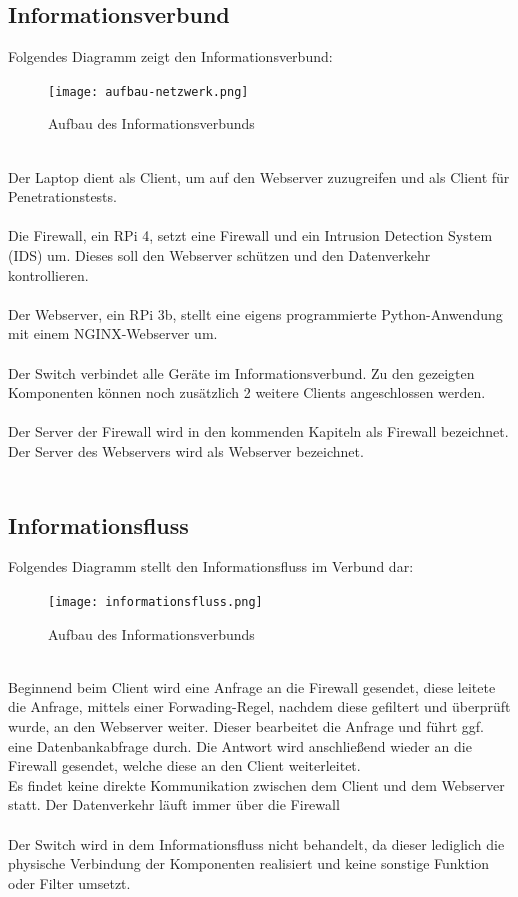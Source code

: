 \documentclass[
    a4paper,
    pagesize,
	pdftex,
    12pt,
]{scrartcl}
\begin{document}
\subsection{Informationsverbund}
Folgendes Diagramm zeigt den Informationsverbund:
\begin{figure}[!ht]
	\centering
	\texttt{[image: aufbau-netzwerk.png]}
	\caption{Aufbau des Informationsverbunds}
	\label{fig:boat1}
\end{figure}
\\
Der Laptop dient als Client, um auf den Webserver zuzugreifen und als Client für  Penetrationstests.  \\ \\
Die Firewall, ein RPi 4, setzt eine Firewall und ein  Intrusion Detection System (IDS) um. Dieses soll den Webserver schützen und den Datenverkehr  kontrollieren.  \\ \\
Der Webserver, ein RPi 3b, stellt eine eigens programmierte Python-Anwendung mit einem NGINX-Webserver um. \\ \\
Der Switch verbindet alle Geräte im Informationsverbund.  Zu den  gezeigten Komponenten können noch zusätzlich  2 weitere  Clients  angeschlossen werden. \\ \\
Der Server der Firewall wird in den kommenden Kapiteln als Firewall bezeichnet. Der Server des Webservers wird als Webserver bezeichnet. \\ \\

\subsection{Informationsfluss}
Folgendes Diagramm stellt den Informationsfluss im Verbund dar:
\begin{figure}[!ht]
	\centering
	\texttt{[image: informationsfluss.png]}
	\caption{Aufbau des Informationsverbunds}
	\label{fig:boat2}
\end{figure}
\\
Beginnend beim Client wird eine Anfrage an die Firewall gesendet, diese leitete die Anfrage, mittels einer Forwading-Regel, nachdem diese gefiltert und überprüft wurde, an den Webserver weiter. Dieser bearbeitet die Anfrage und führt ggf. eine Datenbankabfrage durch. Die Antwort wird anschließend wieder an die Firewall gesendet, welche diese an den Client weiterleitet. \\
Es findet keine direkte Kommunikation zwischen dem Client und dem Webserver statt. Der Datenverkehr läuft immer über die Firewall
\\ \\
Der Switch wird in dem Informationsfluss nicht behandelt, da dieser lediglich die physische Verbindung der Komponenten realisiert und keine sonstige Funktion oder Filter umsetzt.
\end{document}
